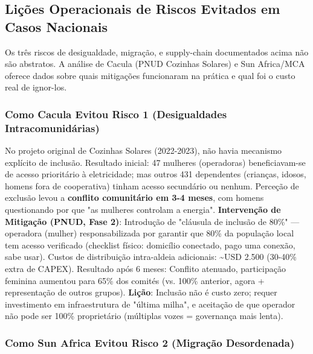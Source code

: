 \documentclass[12pt, a4paper]{article}
\begin{document}
\subsection{Lições Operacionais de Riscos Evitados em Casos Nacionais}

Os três riscos de desigualdade, migração, e supply-chain documentados acima não são abstratos. A análise de Cacula (PNUD Cozinhas Solares) e Sun Africa/MCA oferece dados sobre quais mitigações funcionaram na prática e qual foi o custo real de ignor-los.

\subsubsection*{Como Cacula Evitou Risco 1 (Desigualdades Intracomunidárias)}

No projeto original de Cozinhas Solares (2022-2023), não havia mecanismo explícito de inclusão. Resultado inicial: 47 mulheres (operadoras) beneficiavam-se de acesso prioritário à eletricidade; mas outros 431 dependentes (crianças, idosos, homens fora de cooperativa) tinham acesso secundário ou nenhum. Perceção de exclusão levou a
\textbf{conflito comunitário em 3-4 meses}, com homens questionando por que "as mulheres controlam a energia".
\textbf{Intervenção de Mitigação (PNUD, Fase 2)}: Introdução de "cláusula de inclusão de 80\%" — operadora (mulher) responsabilizada por garantir que 80\% da população local tem acesso verificado (checklist físico: domicílio conectado, pago uma conexão, sabe usar). Custos de distribuição intra-aldeia adicionais: \textasciitilde{}USD 2.500 (30-40\% extra de CAPEX). Resultado após 6 meses: Conflito atenuado, participação feminina aumentou para 65\% dos comités (vs. 100\% anterior, agora + representação de outros grupos).
\textbf{Lição}: Inclusão não é custo zero; requer investimento em infraestrutura de "última milha", e aceitação de que operador não pode ser 100\% proprietário (múltiplas vozes = governança mais lenta).

\subsubsection*{Como Sun Africa Evitou Risco 2 (Migração Desordenada)}
\end{document}

